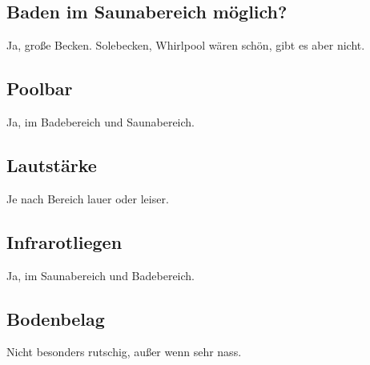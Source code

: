 \documentclass{article}
\begin{document}
\subsection*{Baden im Saunabereich möglich?} Ja, große Becken. Solebecken, Whirlpool wären schön, gibt es aber nicht.
\subsection*{Poolbar} Ja, im Badebereich und Saunabereich.
\subsection*{Lautstärke} Je nach Bereich lauer oder leiser.
\subsection*{Infrarotliegen} Ja, im Saunabereich und Badebereich.
\subsection*{Bodenbelag} Nicht besonders rutschig, außer wenn sehr nass.
\end{document}
